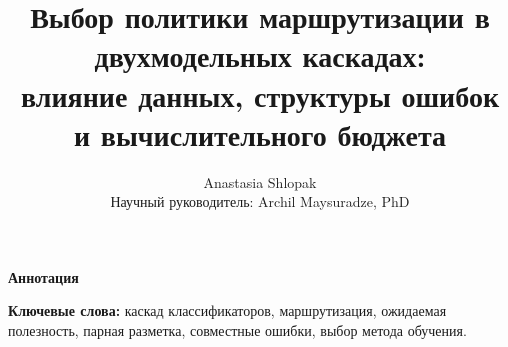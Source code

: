 \documentclass{article}
\title{Выбор политики маршрутизации в двухмодельных каскадах:\\
влияние данных, структуры ошибок и вычислительного бюджета}
\author{Anastasia Shlopak\\Научный руководитель: Archil Maysuradze, PhD}
\renewenvironment{abstract}{\begin{center}\bfseries Аннотация\end{center}\begin{quote}\small}{\end{quote}}
\begin{document}
\maketitle
\begin{abstract}

\end{abstract}
\noindent\textbf{Ключевые слова:} каскад классификаторов, маршрутизация,
ожидаемая полезность, парная разметка, совместные ошибки, выбор метода обучения.







\end{document}
